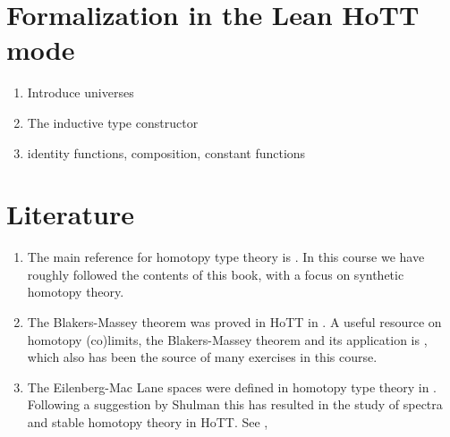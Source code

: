 \documentclass[11pt]{memoir} %
\begin{document}
\appendix

\chapter{Formalization in the Lean HoTT mode}
\begin{enumerate}
\item Introduce universes
\item The inductive type constructor
\item identity functions, composition, constant functions
\end{enumerate}

\chapter{Literature}
\begin{enumerate}
\item The main reference for homotopy type theory is \cite{hottbook}. In this course we have roughly followed the contents of this book, with a focus on synthetic homotopy theory. 
\item The Blakers-Massey theorem was proved in HoTT in \cite{hottBM}.
A useful resource on homotopy (co)limits, the Blakers-Massey theorem and its application is \cite{MunsonVolic}, which also has been the source of many exercises in this course.
\item The Eilenberg-Mac Lane spaces were defined in homotopy type theory in \cite{hottEM}. Following a suggestion by Shulman \cite{ShulmanCoh} this has resulted in the study of spectra and stable homotopy theory in HoTT. See \cite{CavalloCoh}, \cite{FavoniaPhD}
\end{enumerate}

\backmatter

\printbibliography
\end{document}
